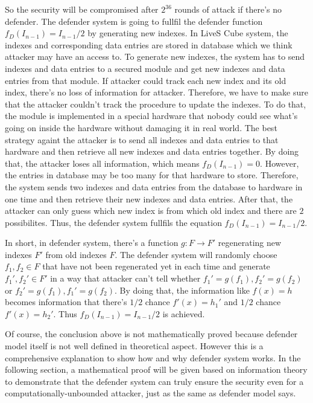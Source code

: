 \documentclass[10pt,a4paper]{article}
\begin{document}
		So the security will be compromised after $2^{36}$ rounds of attack if there's
		no defender. The defender system is going to fullfil the defender
		function $f_D(I_{n-1}) = I_{n-1}/2$ by generating new indexes.
		In LiveS Cube system, the indexes and corresponding data entries are stored
		in database which we think attacker may have an access to. To generate
		new indexes, the system has to send indexes and data entries to a 
		secured module
		and get new indexes and data entries from that module. If attacker
		could track each new index and its old index, there's no loss of information 
		for attacker. Therefore, we have to make sure that the attacker couldn't track
		the procedure to update the indexes.
		To do that, the module is implemented in a special hardware that nobody
		could see what's going on inside the hardware without damaging it in real world.
		The best strategy againt the attacker 
		is to send all indexes and data entries to that hardware and then
		retrieve all new indexes and data entries together. By doing that, the attacker
		loses all information, which means $f_D(I_{n-1}) = 0$. However, the entries
		in database may be too many for that hardware to store. Therefore, the system
		sends two indexes and data entries from the database to hardware in one time and
		then retrieve their new indexes and data entries. After that, the attacker can
		only guess which new index is from which old index and there are $2$ possibilites.
		Thus, the defender system fullfils the equation $f_D(I_{n-1}) = I_{n-1}/2$.
		
		In short, in defender system,
		there's a function $g: F \rightarrow F'$ regenerating 
		new indexes $F'$ from old indexes $F$. The defender system
		will randomly choose $f_1, f_2 \in F$ that have
		not been regenerated yet in each time and generate
		$f_1', f_2' \in F'$ in a way that attacker can't tell whether
		$f_1' = g(f_1), f_2' = g(f_2)$ or $f_2' = g(f_1), f_1' = g(f_2)$.
		By doing that, the information like $f(x) = h$ becomes
		information that there's $1/2$ chance $f'(x) = h_1'$ and $1/2$ chance $f'(x) = h_2'$.
		Thus $f_D(I_{n-1}) = I_{n-1}/2$ is achieved.
		
		Of course, the conclusion above is not mathematically
		proved because defender model itself
		is not well defined in theoretical aspect. 
		However this is a comprehensive explanation to show how and why
		defender system works. In the following section, a mathematical proof
		will be given based on information theory to demonstrate that
		the defender system can truly ensure the security even for
		a computationally-unbounded attacker, just as the same as
		defender model says.
		
\end{document}
